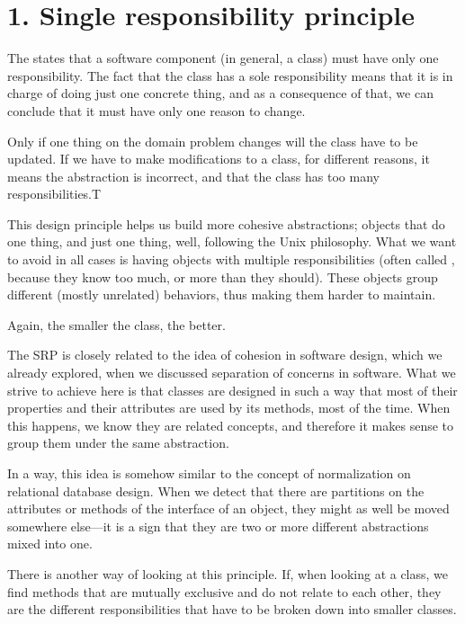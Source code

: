 \documentclass[a4paper,10pt,english]{sphinxmanual}
\begin{document}
\section{1. Single responsibility principle}
\label{\detokenize{chapters/4_solid_principles/index:single-responsibility-principle}}
The  states that a software component (in general, a
class) must have only one responsibility. The fact that the class has a sole responsibility
means that it is in charge of doing just one concrete thing, and as a consequence of that, we
can conclude that it must have only one reason to change.

Only if one thing on the domain problem changes will the class have to be updated. If we
have to make modifications to a class, for different reasons, it means the abstraction is
incorrect, and that the class has too many responsibilities.T

This design principle helps us build more cohesive abstractions; objects that do one thing, and just one
thing, well, following the Unix philosophy. What we want to avoid in all cases is having objects with multiple
responsibilities (often called , because they know too much, or more than they
should). These objects group different (mostly unrelated) behaviors, thus making them
harder to maintain.

Again, the smaller the class, the better.

The SRP is closely related to the idea of cohesion in software design, which we already
explored, when we discussed separation of concerns in software. What we strive to achieve here is that classes
are designed in such a way that most of their properties and their attributes are used by its methods, most of
the time. When this happens, we know they are related concepts, and therefore it makes sense
to group them under the same abstraction.

In a way, this idea is somehow similar to the concept of normalization on relational
database design. When we detect that there are partitions on the attributes or methods of
the interface of an object, they might as well be moved somewhere else—it is a sign that
they are two or more different abstractions mixed into one.

There is another way of looking at this principle. If, when looking at a class, we find
methods that are mutually exclusive and do not relate to each other, they are the different
responsibilities that have to be broken down into smaller classes.
\end{document}
